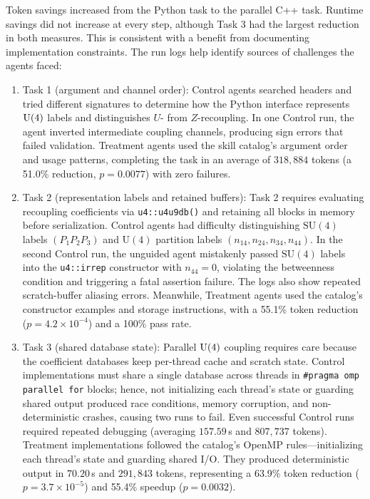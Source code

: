 \documentclass[aps,onecolumn,10pt,superscriptaddress,floatfix,nofootinbib]{revtex4}
\begin{document}
Token savings increased from the Python task to the parallel C++ task. Runtime
savings did not increase at every step, although Task 3 had the largest
reduction in both measures. This is consistent with a benefit from documenting
implementation constraints. %
The run logs help identify sources of challenges the agents faced:
\begin{enumerate}
    \item {Task 1 (argument and channel order):} Control agents searched headers and tried different signatures to determine how the Python interface represents $\rm U(4)$ labels and distinguishes $U$- from $Z$-recoupling. In one Control run, %
the agent inverted intermediate coupling channels, producing sign errors that failed validation. Treatment agents used the skill catalog's argument order and usage patterns, completing the task in an average of $318,884$ tokens (a {51.0\%} reduction, $p = 0.0077$) with zero failures.

    \item {Task 2 (representation labels and retained buffers):} Task 2 requires evaluating recoupling coefficients via \verb|u4::u4u9db()| and retaining all blocks in memory before serialization. Control agents had difficulty distinguishing $\mathrm{SU}(4)$ labels $(P_1 P_2 P_3)$ and $\mathrm{U}(4)$ partition labels $(n_{14}, n_{24}, n_{34}, n_{44})$. In the second Control run, the unguided agent mistakenly passed $\mathrm{SU}(4)$ labels into the \verb|u4::irrep| constructor with $n_{44}=0$, violating the betweenness condition and triggering a fatal assertion failure. %
The logs also show repeated scratch-buffer aliasing errors. Meanwhile, Treatment agents used the catalog's constructor examples and storage instructions, with a {55.1\%} token reduction ($p = 4.2 \times 10^{-4}$) and a 100\% pass rate.

    \item {Task 3 (shared database state):} Parallel $\rm U(4)$ coupling requires care because the coefficient databases keep per-thread cache and scratch state. Control implementations must share a single database across threads in \verb|#pragma omp parallel for| blocks; hence, not initializing each thread's state or guarding shared output produced race conditions, memory corruption, and non-deterministic crashes, causing two runs to fail. %
Even successful Control runs required repeated debugging (averaging $157.59$\,s and $807,737$ tokens). Treatment implementations followed the catalog's OpenMP rules---initializing each thread's state and guarding shared I/O. They produced deterministic output in $70.20$\,s and $291,843$ tokens, representing a {63.9\%} token reduction ($p = 3.7 \times 10^{-5}$) and {55.4\%} speedup ($p = 0.0032$).
\end{enumerate}
\end{document}
